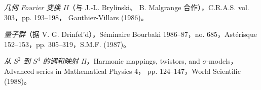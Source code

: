 \begin{description}
\item[{[47]}] \emph{几何 Fourier 变换 II}（与 J.-L. Brylinski、
B. Malgrange 合作），C.R.A.S. vol. 303，pp. 193--198，
Gauthier-Villars (1986)。

\item[{[48]}] \emph{量子群}（据 V. G. Drinfel'd），Séminaire Bourbaki
1986--87，no. 685，Astérisque 152--153，pp. 305--319，S.M.F. (1987)。

\item[{[49]}] \emph{从 $S^2$ 到 $S^4$ 的调和映射 II}，Harmonic mappings,
twistors, and $\sigma$-models，Advanced series in Mathematical Physics 4，
pp. 124--147，World Scientific (1988)。
\end{description}
\normalsize
